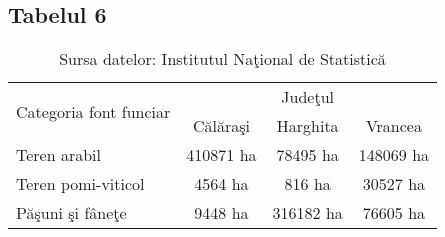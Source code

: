 \documentclass{article}
\begin{document}
\subsection*{Tabelul 6}

\begin{table}[htbp]
	\centering
	\begin{tabular}{|l| c| c| c|}
		\hline
		\multirow{2}{*}{Categoria font funciar} & \multicolumn{3}{c|}{Judeţul} \\
		\cline{2-4}
		& Călăraşi & Harghita & Vrancea \\
		\hline
		Teren arabil & 410871 ha & 78495 ha & 148069 ha \\
		\hline
		Teren pomi-viticol & 4564 ha & 816 ha & 30527 ha \\
		\hline
		Păşuni şi fâneţe & 9448 ha & 316182 ha & 76605 ha \\
		\hline
	\end{tabular}
	\caption{Sursa datelor: Institutul Naţional de Statistică}
	\label{tabel6}
\end{table}
\end{document}
